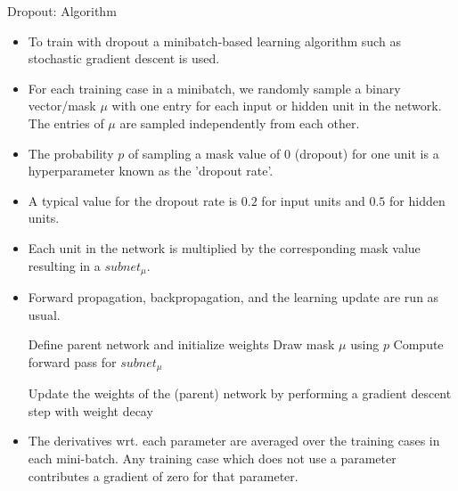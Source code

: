 \documentclass[11pt,compress,t,notes=noshow, xcolor=table]{beamer}
\begin{document}
\begin{vbframe}{Dropout: Algorithm}
  \begin{itemize}
    \item To train with dropout a minibatch-based learning algorithm such as stochastic gradient descent is used.  
    \item For each training case in a minibatch, we randomly sample a binary vector/mask $\mu$ with one entry for each input or hidden unit in the network. The entries of $\mu$ are sampled independently from each other. 
    \item The probability $p$ of sampling a mask value of 0 (dropout) for one unit is a hyperparameter known as the 'dropout rate'. 
    \item A typical value for the dropout rate is $0.2$ for input units and $0.5$ for hidden units. 
    \item Each unit in the network is multiplied by the corresponding mask value resulting in a $subnet_{\mu}$. 
    \item Forward propagation, backpropagation, and the learning update are run as usual.
  \framebreak
  \begin{algorithm}[H]
  \footnotesize
  \caption{Training a (parent) neural network with dropout rate $p$}
    \begin{algorithmic}[1]
      \State Define parent network and initialize weights
        \State Draw mask $\mu$ using $p$
        \State Compute forward pass for $subnet_{\mu}$
        \EndFor
        \State \parbox[t]{\dimexpr\linewidth-\algorithmicindent}{Update the weights of the (parent) network by performing a gradient descent step with weight decay}
      \EndFor
    \end{algorithmic}
  \end{algorithm}
    \item The derivatives wrt. each parameter are averaged over the training cases in each mini-batch. Any training case which does not use a parameter contributes a gradient of zero for that parameter.
      \end{itemize}
\end{vbframe}
\end{document}
